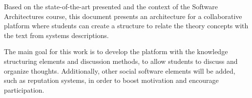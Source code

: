 \documentclass{llncs}
\begin{document}
Based on the state-of-the-art presented and the context of the Software Architectures course, this document presents an architecture for a collaborative platform where students can create a structure to relate the theory concepts with the text from systems descriptions.

The main goal for this work is to develop the platform with the knowledge structuring elements and discussion methods, to allow students to discuss and organize thoughts. Additionally, other social software elements will be added, such as reputation systems, in order to boost motivation and encourage participation. 

%
%


\end{document}
